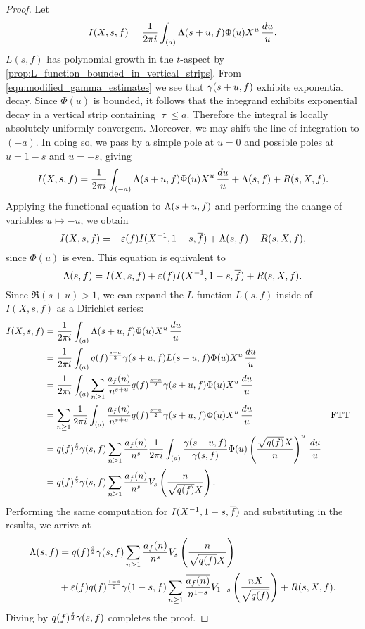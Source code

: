     \begin{proof}
      Let
      \[
        I(X,s,f) = \frac{1}{2\pi i}\int_{(a)}\Lambda(s+u,f)\Phi(u)X^{u}\,\frac{du}{u}.
      \]
      $L(s,f)$ has polynomial growth in the $t$-aspect by \cref{prop:L_function_bounded_in_vertical_strips}. From \cref{equ:modified_gamma_estimates} we see that $\gamma(s+u,f)$ exhibits exponential decay. Since $\Phi(u)$ is bounded, it follows that the integrand exhibits exponential decay in a vertical strip containing $|\tau| \le a$. Therefore the integral is locally absolutely uniformly convergent. Moreover, we may shift the line of integration to $(-a)$. In doing so, we pass by a simple pole at $u = 0$ and possible poles at $u = 1-s$ and $u = -s$, giving
      \[
        I(X,s,f) = \frac{1}{2\pi i}\int_{(-a)}\Lambda(s+u,f)\Phi(u)X^{u}\,\frac{du}{u}+\Lambda(s,f)+R(s,X,f).
      \]
      Applying the functional equation to $\Lambda(s+u,f)$ and performing the change of variables $u \mapsto -u$, we obtain
      \[
        I(X,s,f) = -\varepsilon(f)I(X^{-1},1-s,\overline{f})+\Lambda(s,f)-R(s,X,f),
      \]
      since $\Phi(u)$ is even. This equation is equivalent to
      \[
        \Lambda(s,f) = I(X,s,f)+\varepsilon(f)I(X^{-1},1-s,\overline{f})+R(s,X,f).
      \]
      Since $\Re(s+u) > 1$, we can expand the $L$-function $L(s,f)$ inside of $I(X,s,f)$ as a Dirichlet series:
      \begin{align*}
        I(X,s,f) &= \frac{1}{2\pi i}\int_{(a)}\Lambda(s+u,f)\Phi(u)X^{u}\,\frac{du}{u} \\
        &= \frac{1}{2\pi i}\int_{(a)}q(f)^{\frac{s+u}{2}}\gamma(s+u,f)L(s+u,f)\Phi(u)X^{u}\,\frac{du}{u} \\
        &= \frac{1}{2\pi i}\int_{(a)}\sum_{n \ge 1}\frac{a_{f}(n)}{n^{s+u}}q(f)^{\frac{s+u}{2}}\gamma(s+u,f)\Phi(u)X^{u}\,\frac{du}{u} \\
        &= \sum_{n \ge 1}\frac{1}{2\pi i}\int_{(a)}\frac{a_{f}(n)}{n^{s+u}}q(f)^{\frac{s+u}{2}}\gamma(s+u,f)\Phi(u)X^{u}\,\frac{du}{u} && \text{FTT} \\
        &= q(f)^{\frac{s}{2}}\gamma(s,f)\sum_{n \ge 1}\frac{a_{f}(n)}{n^{s}}\frac{1}{2\pi i}\int_{(a)}\frac{\gamma(s+u,f)}{\gamma(s,f)}\Phi(u)\left(\frac{\sqrt{q(f)}X}{n}\right)^{u}\,\frac{du}{u} \\
        &= q(f)^{\frac{s}{2}}\gamma(s,f)\sum_{n \ge 1}\frac{a_{f}(n)}{n^{s}}V_{s}\left(\frac{n}{\sqrt{q(f)}X}\right).
      \end{align*}
      Performing the same computation for $I(X^{-1},1-s,\overline{f})$ and substituting in the results, we arrive at
      \begin{align*}
        \Lambda(s,f) &= q(f)^{\frac{s}{2}}\gamma(s,f)\sum_{n \ge 1}\frac{a_{f}(n)}{n^{s}}V_{s}\left(\frac{n}{\sqrt{q(f)}X}\right) \\
        &+ \varepsilon(f)q(f)^{\frac{1-s}{2}}\gamma(1-s,f)\sum_{n \ge 1}\frac{\overline{a_{f}(n)}}{n^{1-s}}V_{1-s}\left(\frac{nX}{\sqrt{q(f)}}\right)+R(s,X,f).
      \end{align*}
      Diving by $q(f)^{\frac{s}{2}}\gamma(s,f)$ completes the proof.
    \end{proof}

